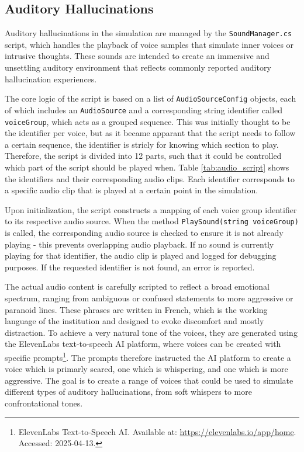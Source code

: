 \subsection{Auditory Hallucinations}

Auditory hallucinations in the simulation are managed by the \texttt{SoundManager.cs} script, which handles the playback of voice samples that simulate inner voices or intrusive thoughts. These sounds are intended to create an immersive and unsettling auditory environment that reflects commonly reported auditory hallucination experiences.

\vspace{1em}

The core logic of the script is based on a list of \texttt{AudioSourceConfig} objects, each of which includes an \texttt{AudioSource} and a corresponding string identifier called \texttt{voiceGroup}, which acts as a grouped sequence. This was initially thought to be the identifier per voice, but as it became apparant that the script needs to follow a certain sequence, the identifier is stricly for knowing which section to play. Therefore, the script is divided into 12 parts, such that it could be controlled which part of the script should be played when. Table \ref{tab:audio_script} shows the identifiers and their corresponding audio clips. Each identifier corresponds to a specific audio clip that is played at a certain point in the simulation.

Upon initialization, the script constructs a mapping of each voice group identifier to its respective audio source. When the method \texttt{PlaySound(string voiceGroup)} is called, the corresponding audio source is checked to ensure it is not already playing - this prevents overlapping audio playback. If no sound is currently playing for that identifier, the audio clip is played and logged for debugging purposes. If the requested identifier is not found, an error is reported.

\vspace{1em}
The actual audio content is carefully scripted to reflect a broad emotional spectrum, ranging from ambiguous or confused statements to more aggressive or paranoid lines. These phrases are written in French, which is the working language of the institution and designed to evoke discomfort and mostly distraction. To achieve a very natural tone of the voices, they are generated using the ElevenLabs text-to-speech AI platform, where voices can be created with specific prompts\footnote{ElevenLabs Text-to-Speech AI. Available at: \url{https://elevenlabs.io/app/home}. Accessed: 2025-04-13.}. The prompts therefore instructed the AI platform to create a voice which is primarly scared, one which is whispering, and one which is more aggressive. The goal is to create a range of voices that could be used to simulate different types of auditory hallucinations, from soft whispers to more confrontational tones.


